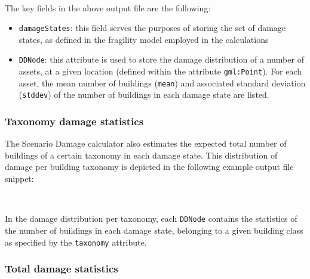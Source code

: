 \inputminted[firstline=1,firstnumber=1,fontsize=\footnotesize,frame=single,bgcolor=lightgray]{xml}{oqum/risk/verbatim/output_scenario_damage_asset.xml}\\

The key fields in the above output file are the following:

\begin{itemize}

  \item \Verb+damageStates+: this field serves the purposes of storing the set
    of damage states, as defined in the \gls{fragility model} employed in the
    calculations

  \item \Verb+DDNode+: this attribute is used to store the damage distribution
    of a number of \glspl{asset}, at a given location (defined within the
    attribute \Verb+gml:Point+). For each \gls{asset}, the mean number of
    buildings (\Verb+mean+) and associated standard deviation (\Verb+stddev+)
    of the number of buildings in each damage state are listed.

\end{itemize}


\subsubsection{Taxonomy damage statistics}
\label{subsubsec:scenario_taxonomy_damage_statistics}

The Scenario Damage calculator also estimates the expected total number of
buildings of a certain \gls{taxonomy} in each damage state. This distribution
of damage per building \gls{taxonomy} is depicted in the following example
output file snippet:

\inputminted[firstline=1,firstnumber=1,fontsize=\footnotesize,frame=single,linenos,bgcolor=lightgray]{xml}{oqum/risk/verbatim/output_scenario_damage_taxonomy.xml}\\

In the damage distribution per \gls{taxonomy}, each \Verb+DDNode+ contains the
statistics of the number of buildings in each damage state, belonging to a
given building class as specified by the \Verb+taxonomy+ attribute.


\subsubsection{Total damage statistics}
\label{subsubsec:scenario_total_damage_statistics}


